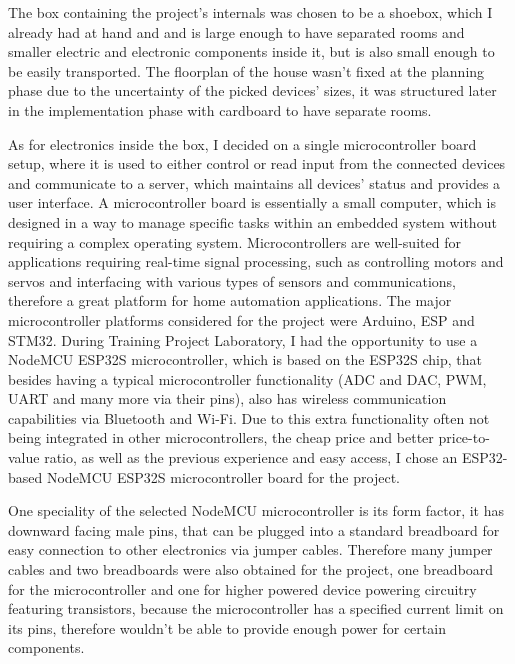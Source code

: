 The box containing the project's internals was chosen to be a shoebox, which I already had at hand and and is large enough to have separated rooms and smaller electric and electronic components inside it, but is also small enough to be easily transported. The floorplan of the house wasn't fixed at the planning phase due to the uncertainty of the picked devices' sizes, it was structured later in the implementation phase with cardboard to have separate rooms.

As for electronics inside the box, I decided on a single microcontroller board setup, where it is used to either control or read input from the connected devices and communicate to a server, which maintains all devices' status and provides a user interface. A microcontroller board is essentially a small computer, which is designed in a way to manage specific tasks within an embedded system without requiring a complex operating system. \cite{IBMmicrocontroller} Microcontrollers are well-suited for applications requiring real-time signal processing, such as controlling motors and servos and interfacing with various types of sensors and communications, therefore a great platform for home automation applications. The major microcontroller platforms considered for the project were Arduino, ESP and STM32. During Training Project Laboratory, I had the opportunity to use a NodeMCU ESP32S microcontroller, which is based on the ESP32S chip, that besides having a typical microcontroller functionality (ADC and DAC, PWM, UART and many more via their pins), also has wireless communication capabilities via Bluetooth and Wi-Fi. Due to this extra functionality often not being integrated in other microcontrollers, the cheap price and better price-to-value ratio, as well as the previous experience and easy access, I chose an ESP32-based NodeMCU ESP32S microcontroller board for the project. \cite{ESPvArduino} \cite{ESPvSTM}

One speciality of the selected NodeMCU microcontroller is its form factor, it has downward facing male pins, that can be plugged into a standard breadboard for easy connection to other electronics via jumper cables. Therefore many jumper cables and two breadboards were also obtained for the project, one breadboard for the microcontroller and one for higher powered device powering circuitry featuring transistors, because the microcontroller has a specified current limit on its pins, therefore wouldn't be able to provide enough power for certain components.

